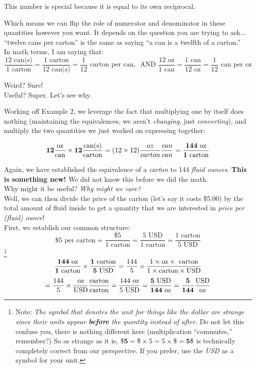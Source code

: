 \documentclass[12pt]{article}
\begin{document}
This number is special because it is equal to its own reciprocal. 

Which means we can flip the role of numerator and denominator in these quantities however you want. It depends on the question you are trying to ask... ``twelve cans per carton'' is the same as saying ``a can is a twelfth of a carton.''\\
In math terms, I am saying that: 
$$
\frac{12 \text{ can(s)}}{1 \text{ carton}} = \frac{1 \text{ carton}}{12 \text{ can(s)}} = \frac{1}{12} \text{ carton per can, } \text{ AND } 
\frac{12\text{ oz}}{1\text{ can}} = \frac{1\text{ can}}{12\text{ oz}} = \frac{1}{12} \text{ can per oz}
$$
\vspace{0.25in}

Weird? Sure! \\
Useful? Super. Let's see why.
\vspace{0.25in}

Working off Example 2, we leverage the fact that multiplying one by itself does nothing (maintaining the equivalences, we aren't \emph{changing}, just \emph{converting}), and multiply the two quantities we just worked on expressing together:

$$
{\bf 12 \frac{\text{oz}}{\text{can}} \times 12 \frac{\text{can(s)}}{\text{carton}} } = (12 \times 12) \frac{oz}{carton} \frac{can}{can} = {\bf \frac{144 \text{ oz}}{1 \text{ carton}} }
$$
\vspace{0.25in}

Again, we have established the equivalence of a \emph{carton} to 144 \emph{fluid ounces}.
\textbf{This is something new! }
We did not know this before we did the math. \\
Why might it be useful?
\emph{Why might we care?}\\

Well, we can then divide the price of the carton (let's say it costs \$5.00) by the total amount of fluid inside to get a quantity that we are interested in \emph{price per (fluid) ounce}!\\
First, we establish our common structure:
$$
\text{\$5 per carton} = \frac{\$5}{1\text{ carton}} = \frac{5 \text{ USD}}{1\text{ carton}} = \frac{1\text{ carton}}{5\text{ USD}}
$$
\footnote{Note: \emph{The symbol that denotes the unit for things like the dollar are strange since their units appear \textbf{before} the quantity instead of after.}
Do not let this confuse you, there is nothing different here (multiplication ``commutes,'' remember?) So as strange as it is, $ {\bf \$5 } = \$\times 5 = 5\times \$ = {\bf 5\$} $ is technically completely correct from our perspective.
If you prefer, use the \emph{USD} as a symbol for your unit. }
$$
{\bf \frac{144 \text{ oz}}{1 \text{ carton}} \times \frac{1\text{ carton}}{5\text{ USD}}} = \frac{144}{5} \times \frac{1\times\text{oz}\times \text{ carton}}{1\times\text{carton}\times \text{USD}} 
$$
$$
= \frac{144}{5} \times \frac{\text{oz}}{\text{USD}} \frac{\text{carton}}{\text{carton}} = \frac{144\text{ oz}}{5\text{ USD}} ={\bf \frac{5\text{ USD}}{144\text{ oz}} =   \frac{5}{144} \frac{\text{USD}}{\text{oz}} }
$$
\vspace{0.25in}
\end{document}
